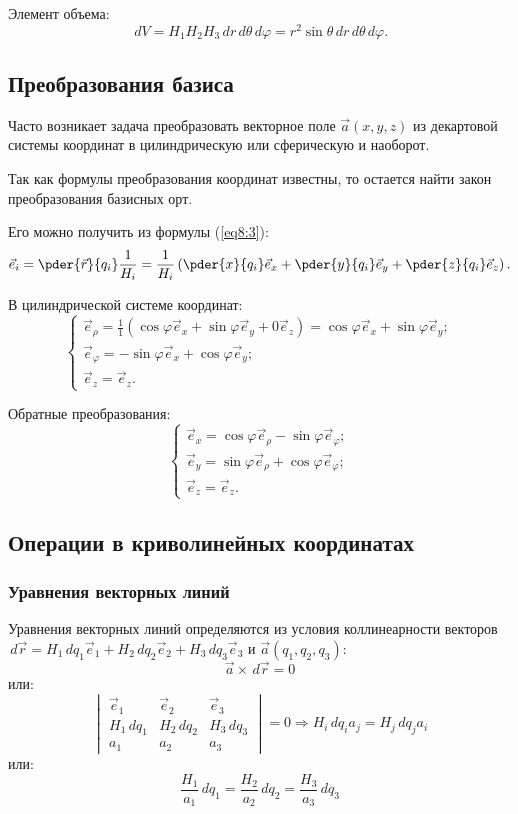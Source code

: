 	Элемент объема:
	\[ \,d V = H_1H_2H_3\,d r\,d\theta\,d\varphi = r^2\sin\theta\,d r\,d\theta\,d\varphi. \]

\subsection{Преобразования базиса}

	Часто возникает задача преобразовать векторное поле \( \vec{a}(x, y, z) \) из декартовой системы координат в цилиндрическую или сферическую и наоборот.
	
	Так как формулы преобразования координат известны, то остается найти закон преобразования базисных орт.
	
	Его можно получить из формулы (\ref{eq8:3}):
	\begin{equation}
		\vec{e}_i = \pder{\vec{r}}{q_i}\frac{1}{H_i} = \frac{1}{H_i}\left(\pder{x}{q_i}\vec{e}_x + \pder{y}{q_i}\vec{e}_y + \pder{z}{q_i}\vec{e}_z\right). \label{eq8:4}
	\end{equation}
	
	В цилиндрической системе координат:
	\[ \left\{ \begin{array}{l}
	\vec{e}_\rho = \frac{1}{1}(\cos\varphi \vec{e}_x + \sin\varphi \vec{e}_y + 0\vec{e}_z) = \cos\varphi\vec{e}_x + \sin\varphi\vec{e}_y; \\
	\vec{e}_\varphi = -\sin\varphi\vec{e}_x + \cos\varphi\vec{e}_y; \\
	\vec{e}_z = \vec{e}_z.
	\end{array} \right. \]
	
	Обратные преобразования:
	\[ \left\{ \begin{array}{l}
	\vec{e}_x = \cos\varphi\vec{e}_\rho - \sin\varphi\vec{e}_\varphi; \\
	\vec{e}_y = \sin\varphi\vec{e}_\rho + \cos\varphi\vec{e}_\varphi; \\
	\vec{e}_z = \vec{e}_z.
	\end{array} \right. \]

\subsection{Операции в криволинейных координатах}

\subsubsection{Уравнения векторных линий}

	Уравнения векторных линий определяются из условия коллинеарности векторов \( \,d\vec{r} = H_1\,d q_1\vec{e}_1 + H_2\,d q_2\vec{e}_2 + H_3\,d q_3\vec{e}_3 \) и \( \vec{a}(q_1, q_2, q_3) \):
	\[ \vec{a}\times\,d\vec{r} = 0 \]
	или:
	\[ \begin{vmatrix}
	\vec{e}_1 & \vec{e}_2 & \vec{e}_3 \\
	H_1\,d q_1 & H_2\,d q_2 & H_3\,d q_3 \\
	a_1 & a_2 & a_3
	\end{vmatrix} = 0 \Rightarrow H_i\,d q_ia_j = H_j\,d q_ja_i \]
	или:
	\begin{equation}
		\frac{H_1}{a_1}\,d q_1 = \frac{H_2}{a_2}\,d q_2 = \frac{H_3}{a_3}\,d q_3 \label{eq8.1:1}
	\end{equation}
	
